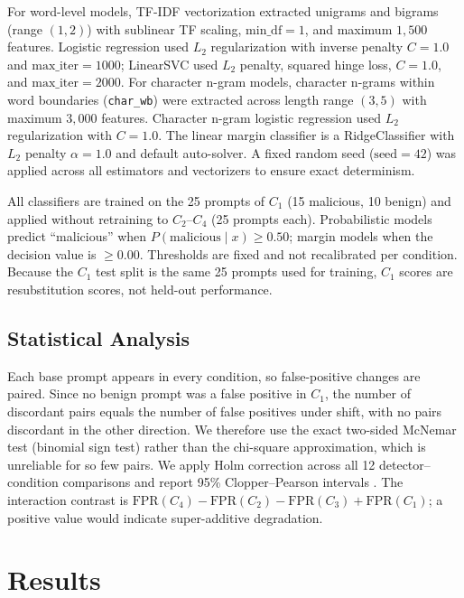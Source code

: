 \documentclass[conference]{IEEEtran}
\begin{document}
For word-level models, TF-IDF vectorization extracted unigrams and bigrams (range $(1, 2)$) with sublinear TF scaling, $\text{min\_df} = 1$, and maximum $1,500$ features. Logistic regression used $L_2$ regularization with inverse penalty $C = 1.0$ and $\text{max\_iter} = 1000$; LinearSVC used $L_2$ penalty, squared hinge loss, $C = 1.0$, and $\text{max\_iter} = 2000$. For character n-gram models, character n-grams within word boundaries (\texttt{char\_wb}) were extracted across length range $(3, 5)$ with maximum $3,000$ features. Character n-gram logistic regression used $L_2$ regularization with $C = 1.0$. The linear margin classifier is a RidgeClassifier with $L_2$ penalty $\alpha = 1.0$ and default auto-solver. A fixed random seed ($\text{seed} = 42$) was applied across all estimators and vectorizers to ensure exact determinism.

All classifiers are trained on the 25 prompts of $C_1$ (15 malicious, 10 benign) and applied without retraining to $C_2$--$C_4$ (25 prompts each). Probabilistic models predict ``malicious'' when $P(\text{malicious} \mid x) \ge 0.50$; margin models when the decision value is $\ge 0.00$. Thresholds are fixed and not recalibrated per condition. Because the $C_1$ test split is the same 25 prompts used for training, $C_1$ scores are resubstitution scores, not held-out performance.

\subsection{Statistical Analysis}
Each base prompt appears in every condition, so false-positive changes are paired. Since no benign prompt was a false positive in $C_1$, the number of discordant pairs equals the number of false positives under shift, with no pairs discordant in the other direction. We therefore use the exact two-sided McNemar test (binomial sign test) \cite{mcnemar1947note} rather than the chi-square approximation, which is unreliable for so few pairs. We apply Holm correction \cite{holm1979simple} across all 12 detector--condition comparisons and report 95\% Clopper--Pearson intervals \cite{clopper1934use}. The interaction contrast is $\text{FPR}(C_4) - \text{FPR}(C_2) - \text{FPR}(C_3) + \text{FPR}(C_1)$; a positive value would indicate super-additive degradation.

\section{Results}
\label{sec:results}
\end{document}
